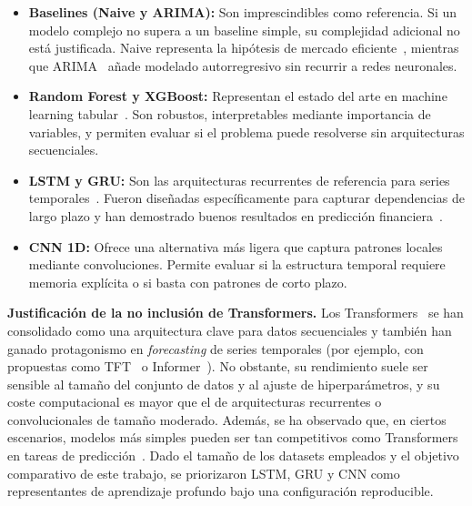 \begin{itemize}
    \item \textbf{Baselines (Naive y ARIMA):} Son imprescindibles como referencia. Si un modelo complejo no supera a un baseline simple, su complejidad adicional no está justificada. Naive representa la hipótesis de mercado eficiente~\cite{fama1970efficient}, mientras que ARIMA~\cite{box2015time} añade modelado autorregresivo sin recurrir a redes neuronales.
    
    \item \textbf{Random Forest y XGBoost:} Representan el estado del arte en machine learning tabular~\cite{breiman2001random, chen2016xgboost}. Son robustos, interpretables mediante importancia de variables, y permiten evaluar si el problema puede resolverse sin arquitecturas secuenciales.
    
    \item \textbf{LSTM y GRU:} Son las arquitecturas recurrentes de referencia para series temporales~\cite{hochreiter1997long, cho2014learning}. Fueron diseñadas específicamente para capturar dependencias de largo plazo y han demostrado buenos resultados en predicción financiera~\cite{fischer2018deep}.
    
    \item \textbf{CNN 1D:} Ofrece una alternativa más ligera que captura patrones locales mediante convoluciones. Permite evaluar si la estructura temporal requiere memoria explícita o si basta con patrones de corto plazo.
\end{itemize}

\textbf{Justificación de la no inclusión de Transformers.} Los Transformers~\cite{vaswani2017attention} se han consolidado como una arquitectura clave para datos secuenciales y también han ganado protagonismo en \textit{forecasting} de series temporales (por ejemplo, con propuestas como TFT~\cite{lim2021tft} o Informer~\cite{zhou2021informer}). No obstante, su rendimiento suele ser sensible al tamaño del conjunto de datos y al ajuste de hiperparámetros, y su coste computacional es mayor que el de arquitecturas recurrentes o convolucionales de tamaño moderado. Además, se ha observado que, en ciertos escenarios, modelos más simples pueden ser tan competitivos como Transformers en tareas de predicción~\cite{zeng2023transformers}. Dado el tamaño de los datasets empleados y el objetivo comparativo de este trabajo, se priorizaron LSTM, GRU y CNN como representantes de aprendizaje profundo bajo una configuración reproducible.

